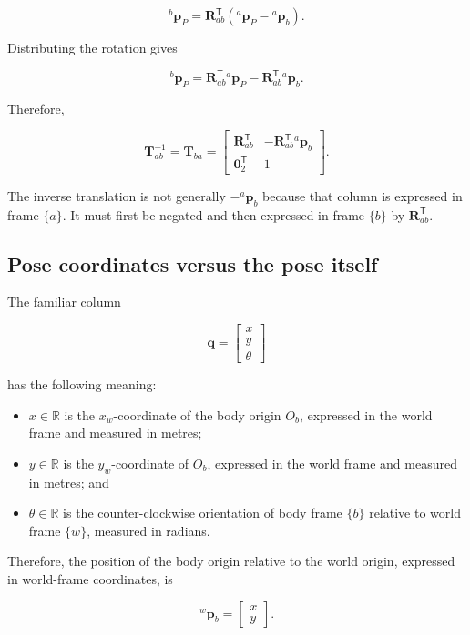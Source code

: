 \documentclass[
  australian,
  12pt,
  letterpaper,
  DIV=11,
  numbers=noendperiod,
  twoside]{scrreprt}
\providecommand{\tightlist}{%
  \setlength{\itemsep}{0pt}\setlength{\parskip}{0pt}}
\begin{document}
\[
{}^{b}\mathbf p_P
=
\mathbf R_{ab}^\mathsf T
\left(
{}^{a}\mathbf p_P-{}^{a}\mathbf p_b
\right).
\]

Distributing the rotation gives

\[
{}^{b}\mathbf p_P
=
\mathbf R_{ab}^\mathsf T{}^{a}\mathbf p_P
-
\mathbf R_{ab}^\mathsf T{}^{a}\mathbf p_b.
\]

Therefore,

\[
\boxed{
\mathbf T_{ab}^{-1}
=
\mathbf T_{ba}
=
\begin{bmatrix}
\mathbf R_{ab}^\mathsf T&
-\mathbf R_{ab}^\mathsf T{}^{a}\mathbf p_b\\
\mathbf 0_2^\mathsf T&1
\end{bmatrix}
}.
\]

The inverse translation is not generally \(-{}^{a}\mathbf p_b\) because
that column is expressed in frame \(\{a\}\). It must first be negated
and then expressed in frame \(\{b\}\) by \(\mathbf R_{ab}^\mathsf T\).

\subsection{Pose coordinates versus the pose
itself}\label{pose-coordinates-versus-the-pose-itself}

The familiar column

\[
\mathbf q
=
\begin{bmatrix}
x\\y\\\theta
\end{bmatrix}
\]

has the following meaning:

\begin{itemize}
\tightlist
\item
  \(x\in\mathbb R\) is the \(x_w\)-coordinate of the body origin
  \(O_b\), expressed in the world frame and measured in metres;
\item
  \(y\in\mathbb R\) is the \(y_w\)-coordinate of \(O_b\), expressed in
  the world frame and measured in metres; and
\item
  \(\theta\in\mathbb R\) is the counter-clockwise orientation of body
  frame \(\{b\}\) relative to world frame \(\{w\}\), measured in
  radians.
\end{itemize}

Therefore, the position of the body origin relative to the world origin,
expressed in world-frame coordinates, is

\[
{}^w\mathbf p_b
=
\begin{bmatrix}
x\\y
\end{bmatrix}.
\]
\end{document}

